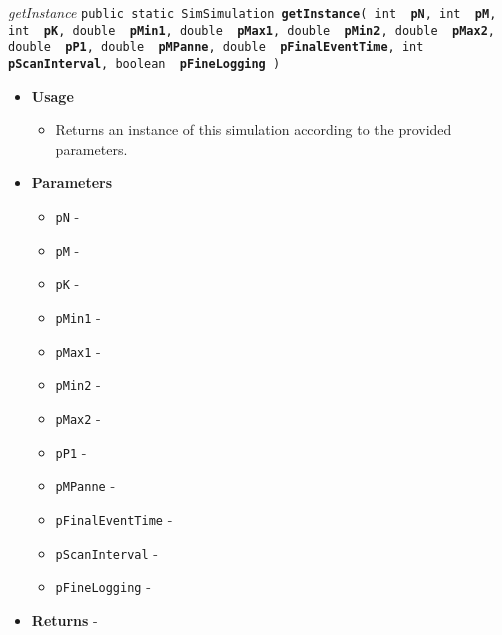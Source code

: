 \documentclass[11pt]{report}
\newcommand{\isep}[0]{%
\setlength{\itemsep}{-.4ex}
}
\newcommand{\sld}[0]{%
\setlength{\topsep}{0em}
\setlength{\partopsep}{0em}
\setlength{\parskip}{0em}
\setlength{\parsep}{-1em}
}
\newcommand{\membername}[1]{{\it #1}\linebreak}
\begin{document}
{{{{\begin{itemize}
{\membername{getInstance}
{\tt public static SimSimulation {\bf getInstance}( {\tt int } {\bf pN},
{\tt int } {\bf pM},
{\tt int } {\bf pK},
{\tt double } {\bf pMin1},
{\tt double } {\bf pMax1},
{\tt double } {\bf pMin2},
{\tt double } {\bf pMax2},
{\tt double } {\bf pP1},
{\tt double } {\bf pMPanne},
{\tt double } {\bf pFinalEventTime},
{\tt int } {\bf pScanInterval},
{\tt boolean } {\bf pFineLogging} )
\label{l14}\label{l15}}%
\begin{itemize}
\sld
\item{
\sld
{\bf Usage}
  \begin{itemize}\isep
   \item{
Returns an instance of this simulation according to the provided parameters.
}%
  \end{itemize}
}
\item{
\sld
{\bf Parameters}
\sld\isep
  \begin{itemize}
\sld\isep
   \item{
\sld
{\tt pN} - }
   \item{
\sld
{\tt pM} - }
   \item{
\sld
{\tt pK} - }
   \item{
\sld
{\tt pMin1} - }
   \item{
\sld
{\tt pMax1} - }
   \item{
\sld
{\tt pMin2} - }
   \item{
\sld
{\tt pMax2} - }
   \item{
\sld
{\tt pP1} - }
   \item{
\sld
{\tt pMPanne} - }
   \item{
\sld
{\tt pFinalEventTime} - }
   \item{
\sld
{\tt pScanInterval} - }
   \item{
\sld
{\tt pFineLogging} - }
  \end{itemize}
}%
\item{{\bf Returns} - 
 
}
\end{itemize}}
\end{itemize}}}}}
\end{document}
